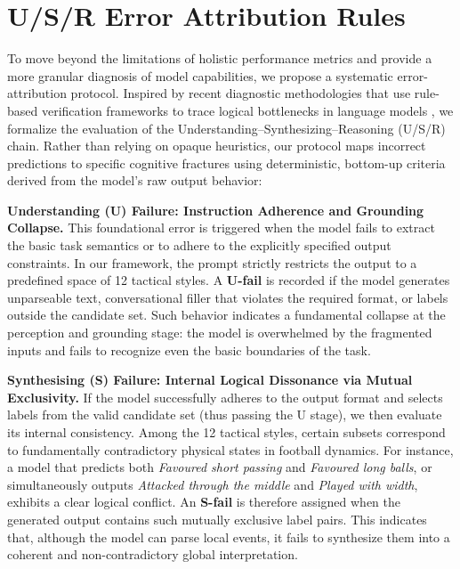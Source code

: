 

\section{U/S/R Error Attribution Rules}
\label{sec:usrules}

To move beyond the limitations of holistic performance metrics and provide a more granular diagnosis of model capabilities, we propose a systematic error-attribution protocol. Inspired by recent diagnostic methodologies that use rule-based verification frameworks to trace logical bottlenecks in language models \cite{mukherjee2026red,rafailov2023direct,zhiren2026learning}, we formalize the evaluation of the Understanding--Synthesizing--Reasoning (U/S/R) chain. Rather than relying on opaque heuristics, our protocol maps incorrect predictions to specific cognitive fractures using deterministic, bottom-up criteria derived from the model's raw output behavior:

\textbf{Understanding (U) Failure: Instruction Adherence and Grounding Collapse.} This foundational error is triggered when the model fails to extract the basic task semantics or to adhere to the explicitly specified output constraints. In our framework, the prompt strictly restricts the output to a predefined space of 12 tactical styles. A \textbf{U-fail} is recorded if the model generates unparseable text, conversational filler that violates the required format, or labels outside the candidate set. Such behavior indicates a fundamental collapse at the perception and grounding stage: the model is overwhelmed by the fragmented inputs and fails to recognize even the basic boundaries of the task.

\textbf{Synthesising (S) Failure: Internal Logical Dissonance via Mutual Exclusivity.} If the model successfully adheres to the output format and selects labels from the valid candidate set (thus passing the U stage), we then evaluate its internal consistency. Among the 12 tactical styles, certain subsets correspond to fundamentally contradictory physical states in football dynamics. For instance, a model that predicts both \textit{Favoured short passing} and \textit{Favoured long balls}, or simultaneously outputs \textit{Attacked through the middle} and \textit{Played with width}, exhibits a clear logical conflict. An \textbf{S-fail} is therefore assigned when the generated output contains such mutually exclusive label pairs. This indicates that, although the model can parse local events, it fails to synthesize them into a coherent and non-contradictory global interpretation.

